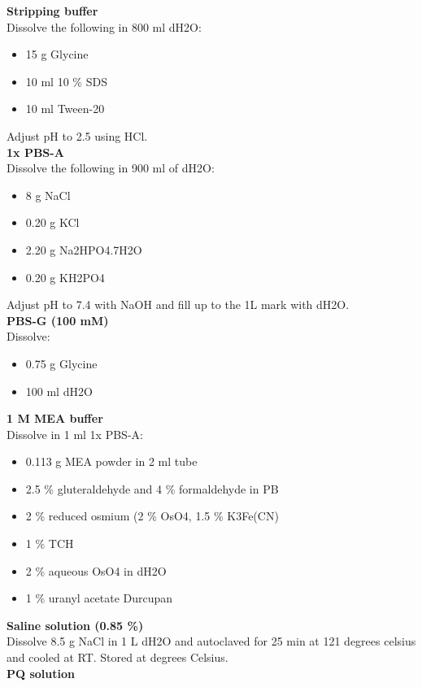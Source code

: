 \noindent
\textbf{Stripping buffer}\\
Dissolve the following in 800 ml dH2O:
\begin{itemize}
\item 15 g Glycine
\item 10 ml 10 \% SDS 
\item 10 ml Tween-20
\end{itemize}
Adjust pH to 2.5 using HCl.\\
 
\noindent
\textbf{1x PBS-A}\\
Dissolve the following in 900 ml of dH2O:
\begin{itemize}
\item 8 g NaCl 
\item 0.20 g KCl 
\item 2.20 g Na2HPO4.7H2O
\item 0.20 g KH2PO4 
\end{itemize}
Adjust pH to 7.4 with NaOH and fill up to the 1L mark with dH2O.\\

\noindent
\textbf{PBS-G (100 mM)}\\
Dissolve:
\begin{itemize}
\item 0.75 g Glycine 
\item 100 ml dH2O
\end{itemize}

\noindent
\textbf{1 M MEA buffer}\\
Dissolve in 1 ml 1x PBS-A:
\begin{itemize}
\item 0.113 g MEA powder in 2 ml tube
\item 2.5 \% gluteraldehyde and 4 \% formaldehyde in PB
\item 2 \% reduced osmium (2 \% OsO4, 1.5 \% K3Fe(CN)
\item 1 \% TCH
\item 2 \% aqueous OsO4 in dH2O
\item 1 \% uranyl acetate Durcupan
\end{itemize}

\noindent
\textbf{Saline solution (0.85 \%)}\\
Dissolve 8.5 g NaCl in 1 L dH2O and autoclaved for 25 min at 121 degrees celsius and cooled at RT.
Stored at degrees Celsius. \\

\noindent
\textbf {PQ solution}\\

